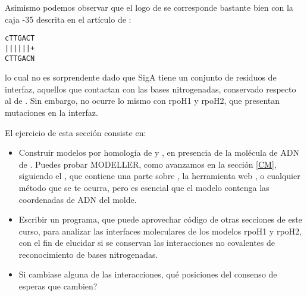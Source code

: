 
Asimismo podemos observar que el logo de 
se corresponde bastante bien con la caja -35 descrita en el art\'{i}culo de \cite{RamirezRomero2006}:
\begin{center} 
\texttt{cTTGACT}\\
\texttt{||||||+}\\
\texttt{CTTGACN}\\
\end{center} 
lo cual no es sorprendente dado que SigA tiene un conjunto de residuos de interfaz, aquellos que contactan con las bases nitrogenadas,
conservado respecto al de . Sin embargo, no 
ocurre lo mismo con rpoH1 y rpoH2, que presentan mutaciones en la interfaz.

El ejercicio de esta secci\'{o}n consiste en:
\begin{itemize}

\item Construir modelos por homolog\'{i}a de 
 y
, en presencia de la mol\'{e}cula de ADN de 
. Puedes probar MODELLER, 
como avanzamos en la secci\'{o}n \ref{CM}, siguiendo el 
, que contiene una parte sobre 
, la herramienta web 
, o cualquier m\'{e}todo que se te ocurra, 
pero es esencial que el modelo contenga las coordenadas de ADN del molde.

\item Escribir un programa, que puede aprovechar c\'{o}digo de otras secciones de este curso, para analizar las interfaces
moleculares de los modelos rpoH1 y rpoH2, con el fin de elucidar si se conservan las interacciones no covalentes
de reconocimiento de bases nitrogenadas.

\item Si cambiase alguna de las interacciones, qu\'{e} posiciones del consenso de 
esperas que cambien?

\end{itemize}




